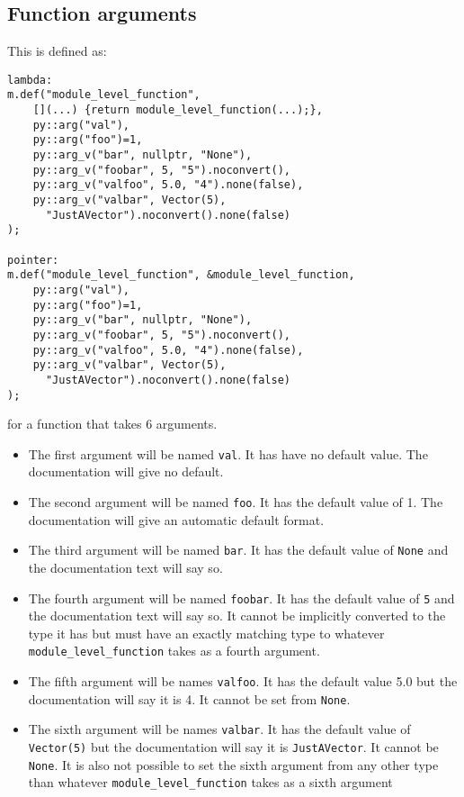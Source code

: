 \subsection{Function arguments}
This is defined as:
\begin{verbatim}
lambda:
m.def("module_level_function",
    [](...) {return module_level_function(...);},
    py::arg("val"),
    py::arg("foo")=1,
    py::arg_v("bar", nullptr, "None"),
    py::arg_v("foobar", 5, "5").noconvert(),
    py::arg_v("valfoo", 5.0, "4").none(false),
    py::arg_v("valbar", Vector(5),
      "JustAVector").noconvert().none(false)
);

pointer:
m.def("module_level_function", &module_level_function,
    py::arg("val"),
    py::arg("foo")=1,
    py::arg_v("bar", nullptr, "None"),
    py::arg_v("foobar", 5, "5").noconvert(),
    py::arg_v("valfoo", 5.0, "4").none(false),
    py::arg_v("valbar", Vector(5),
      "JustAVector").noconvert().none(false)
);
\end{verbatim}
for a function that takes 6 arguments.
\begin{itemize}
\item The first argument will be named \verb|val|.  It has have no default value.  The documentation will give no default.
\item The second argument will be named \verb|foo|.  It has the default value of 1.  The documentation will give an automatic default format.
\item The third argument will be named \verb|bar|.  It has the default value of \verb|None| and the documentation text will say so.
\item The fourth argument will be named \verb|foobar|.  It has the default value of \verb|5| and the documentation text will say so.  It cannot be implicitly converted to the type it has but must have an exactly matching type to whatever \verb|module_level_function| takes as a fourth argument.
\item The fifth argument will be names \verb|valfoo|.  It has the default value 5.0 but the documentation will say it is 4.  It cannot be set from \verb|None|.
\item The sixth argument will be names \verb|valbar|.  It has the default value of \verb|Vector(5)| but the documentation will say it is \verb|JustAVector|.  It cannot be \verb|None|.  It is also not possible to set the sixth argument from any other type than whatever \verb|module_level_function| takes as a sixth argument
\end{itemize}

